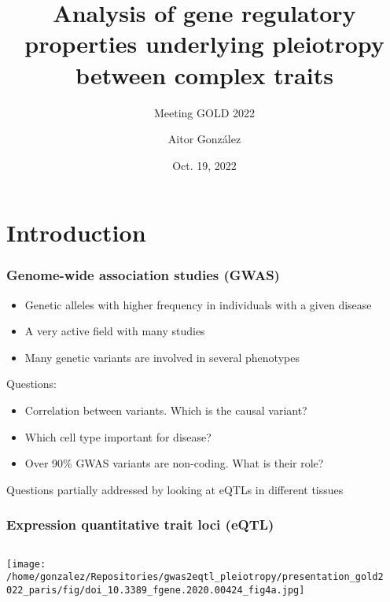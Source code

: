\documentclass{beamer}
\title{Analysis of gene regulatory properties underlying pleiotropy between complex traits}
\subtitle{Meeting GOLD 2022}
\author{Aitor Gonz\'alez}
\institute{Aix Marseille Univ, INSERM, TAGC}
\date{Oct. 19, 2022}
\begin{document}
\begin{frame}

\titlepage

\end{frame}


\section{Introduction} %

\begin{frame}
\frametitle{Genome-wide association studies (GWAS)}

\begin{itemize}
\item Genetic alleles with higher frequency in individuals with a given disease
\item A very active field with many studies
\item Many genetic variants are involved in several phenotypes
\end{itemize}
%
\vfill
%
Questions:
%
\begin{itemize}
\item Correlation between variants. Which is the causal variant?
\item Which cell type important for disease?
\item Over 90\% GWAS variants are non-coding. What is their role?
\end{itemize}
%
\vfill
%
Questions partially addressed by looking at eQTLs in different tissues

\let\thefootnote\relax{}

\end{frame}

\begin{frame}
\frametitle{Expression quantitative trait loci (eQTL)}

\begin{columns}
\begin{column}{0.5\textwidth}
    \begin{center}
\texttt{[image: /home/gonzalez/Repositories/gwas2eqtl\_pleiotropy/presentation\_gold2022\_paris/fig/doi\_10.3389\_fgene.2020.00424\_fig4a.jpg]}
     \end{center}
\end{column}
\begin{column}{0.5\textwidth}

\end{column}
\end{columns}

\let\thefootnote\relax{}
\end{frame}
\end{document}
